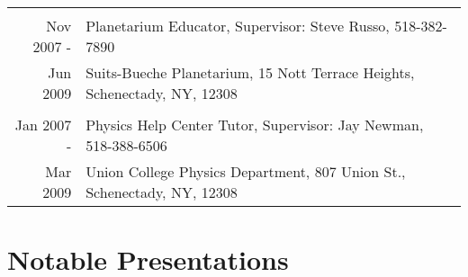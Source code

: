 \documentclass[10pt]{article} %
\begin{document}
\begin{tabulary}{\textwidth}{RL}
\vspace{5pt} \\

Nov 2007 -     & Planetarium Educator, Supervisor: Steve Russo, 518-382-7890 \\
 Jun 2009      & Suits-Bueche Planetarium, 15 Nott Terrace Heights, Schenectady, NY, 12308 \\ %

\vspace{5pt} \\

Jan 2007 -     & Physics Help Center Tutor, Supervisor: Jay Newman, 518-388-6506 \\
 Mar 2009      & Union College Physics Department, 807 Union St., Schenectady, NY, 12308 \\

\end{tabulary}



\section{Notable Presentations}
\end{document}
